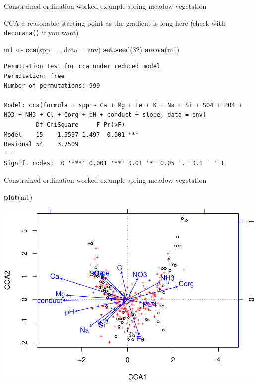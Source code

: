 \documentclass[10pt,ignorenonframetext,compress, aspectratio=169]{beamer}
\newenvironment{Shaded}{\begin{snugshade}}{\end{snugshade}}
\newcommand{\KeywordTok}[1]{\textcolor[rgb]{0.13,0.29,0.53}{\textbf{{#1}}}}
\newcommand{\DataTypeTok}[1]{\textcolor[rgb]{0.13,0.29,0.53}{{#1}}}
\newcommand{\DecValTok}[1]{\textcolor[rgb]{0.00,0.00,0.81}{{#1}}}
\newcommand{\StringTok}[1]{\textcolor[rgb]{0.31,0.60,0.02}{{#1}}}
\newcommand{\NormalTok}[1]{{#1}}
\begin{document}
\begin{frame}[fragile]{Constrained ordination worked example \textbar{}
spring meadow vegetation}

CCA a reasonable starting point as the gradient is long here (check with
\texttt{decorana()} if you want)

\scriptsize

\begin{Shaded}
\begin{Highlighting}[]
\NormalTok{m1 <-}\StringTok{ }\KeywordTok{cca}\NormalTok{(spp ~}\StringTok{ }\NormalTok{., }\DataTypeTok{data =} \NormalTok{env)}
\KeywordTok{set.seed}\NormalTok{(}\DecValTok{32}\NormalTok{)}
\KeywordTok{anova}\NormalTok{(m1)}
\end{Highlighting}
\end{Shaded}

\begin{verbatim}
Permutation test for cca under reduced model
Permutation: free
Number of permutations: 999

Model: cca(formula = spp ~ Ca + Mg + Fe + K + Na + Si + SO4 + PO4 + NO3 + NH3 + Cl + Corg + pH + conduct + slope, data = env)
         Df ChiSquare     F Pr(>F)    
Model    15    1.5597 1.497  0.001 ***
Residual 54    3.7509                 
---
Signif. codes:  0 '***' 0.001 '**' 0.01 '*' 0.05 '.' 0.1 ' ' 1
\end{verbatim}

\normalsize

\end{frame}

\begin{frame}[fragile]{Constrained ordination worked example \textbar{}
spring meadow vegetation}

\scriptsize

\begin{Shaded}
\begin{Highlighting}[]
\KeywordTok{plot}\NormalTok{(m1)}
\end{Highlighting}
\end{Shaded}

\begin{center}\includegraphics[width=0.5\linewidth]{vegan-constrained-slides_files/figure-beamer/meadows-cca-full-triplot-1} \end{center}

\normalsize

\end{frame}
\end{document}
